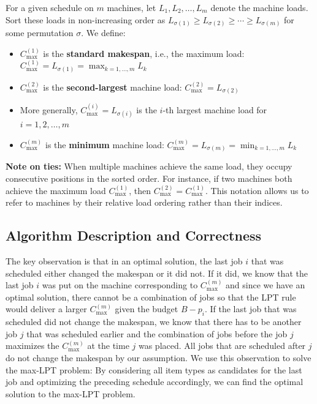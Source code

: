 \begin{definition}
For a given schedule on $m$ machines, let $L_1, L_2, \ldots, L_m$ denote the machine loads. Sort these loads in non-increasing order as $L_{\sigma(1)} \geq L_{\sigma(2)} \geq \cdots \geq L_{\sigma(m)}$ for some permutation $\sigma$. We define:
\begin{itemize}
    \item $C_{\max}^{(1)}$ is the \textbf{standard makespan}, i.e., the maximum load: $C_{\max}^{(1)} = L_{\sigma(1)} = \max_{k=1,\ldots,m} L_k$
    \item $C_{\max}^{(2)}$ is the \textbf{second-largest} machine load: $C_{\max}^{(2)} = L_{\sigma(2)}$
    \item More generally, $C_{\max}^{(i)} = L_{\sigma(i)}$ is the $i$-th largest machine load for $i = 1, 2, \ldots, m$
    \item $C_{\max}^{(m)}$ is the \textbf{minimum} machine load: $C_{\max}^{(m)} = L_{\sigma(m)} = \min_{k=1,\ldots,m} L_k$
\end{itemize}
\end{definition}

\textbf{Note on ties:} When multiple machines achieve the same load, they occupy consecutive positions in the sorted order. For instance, if two machines both achieve the maximum load $C_{\max}^{(1)}$, then $C_{\max}^{(2)} = C_{\max}^{(1)}$. This notation allows us to refer to machines by their relative load ordering rather than their indices.

\subsection{Algorithm Description and Correctness}

The key observation is that in an optimal solution, the last job $i$ that was scheduled either changed the makespan or it did not. If it did, we know that the last job $i$ was put on the machine corresponding to $C_{\max}^{(m)}$ and since we have an optimal solution, there cannot be a combination of jobs so that the LPT rule would deliver a larger $C_{\max}^{(m)}$ given the budget $B - p_i$.
If the last job that was scheduled did not change the makespan, we know that there has to be another job $j$ that was scheduled earlier and the combination of jobs before the job $j$ maximizes the $C_{\max}^{(m)}$ at the time $j$ was placed. All jobs that are scheduled after $j$ do not change the makespan by our assumption. We use this observation to solve the max-LPT problem:
By considering all item types as candidates for the last job and optimizing the preceding schedule accordingly, we can find the optimal solution to the max-LPT problem.

